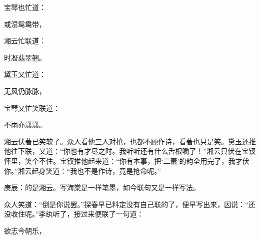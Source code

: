 \begin{parag}
    宝琴也忙道：
\end{parag}


\begin{poem}
    \begin{pl} 或湿鸳鸯带，\end{pl}
\end{poem}


\begin{parag}
    湘云忙联道：
\end{parag}


\begin{poem}
    \begin{pl} 时凝翡翠翘。\end{pl}
\end{poem}


\begin{parag}
    黛玉又忙道：
\end{parag}


\begin{poem}
    \begin{pl} 无风仍脉脉，\end{pl}
\end{poem}


\begin{parag}
    宝琴又忙笑联道：
\end{parag}


\begin{poem}
    \begin{pl} 不雨亦潇潇。\end{pl}
\end{poem}


\begin{parag}
    湘云伏著已笑软了。众人看他三人对抢，也都不顾作诗，看著也只是笑。黛玉还推他往下联，又道：“你也有才尽之时。我听听还有什么舌根嚼了！”湘云只伏在宝钗怀里，笑个不住。宝钗推他起来道：“你有本事，把‘二萧’的韵全用完了，我才伏你。”湘云起身笑道：“我也不是作诗，竟是抢命呢。”\begin{note}庚辰：的是湘云。写海棠是一样笔墨，如今联句又是一样写法。\end{note}众人笑道：“倒是你说罢。”探春早已料定没有自己联的了，便早写出来，因说：“还没收住呢。”李纨听了，接过来便联了一句道：
\end{parag}


\begin{poem}
    \begin{pl} 欲志今朝乐，\end{pl}
\end{poem}


